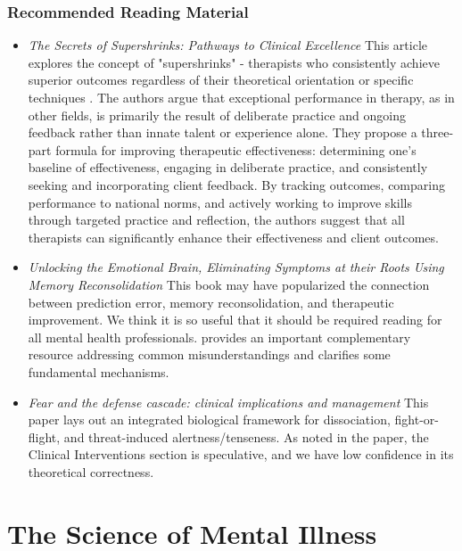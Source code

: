 \documentclass[12pt,letterpaper]{book}
\begin{document}
\subsection*{Recommended Reading Material}
\begin{itemize}
	\item \textit{The Secrets of Supershrinks: Pathways to Clinical Excellence} This article explores the concept of "supershrinks" - therapists who consistently achieve superior outcomes regardless of their theoretical orientation or specific techniques \cite{miller2014secrets}. The authors argue that exceptional performance in therapy, as in other fields, is primarily the result of deliberate practice and ongoing feedback rather than innate talent or experience alone. They propose a three-part formula for improving therapeutic effectiveness: determining one's baseline of effectiveness, engaging in deliberate practice, and consistently seeking and incorporating client feedback. By tracking outcomes, comparing performance to national norms, and actively working to improve skills through targeted practice and reflection, the authors suggest that all therapists can significantly enhance their effectiveness and client outcomes.
	\item \textit{Unlocking the Emotional Brain, Eliminating Symptoms at their Roots Using Memory Reconsolidation} This book may have popularized the connection between prediction error, memory reconsolidation, and therapeutic improvement. We think it is so useful that it should be required reading for all mental health professionals. \textcite{ecker2015misunderstood} provides an important complementary resource addressing common misunderstandings and clarifies some fundamental mechanisms.
	\item \textit{Fear and the defense cascade: clinical implications and management} This paper lays out an integrated biological framework for dissociation, fight-or-flight, and threat-induced alertness/tenseness. As noted in the paper, the Clinical Interventions section is speculative, and we have low confidence in its theoretical correctness.
\end{itemize}
\chapter{The Science of Mental Illness}
\end{document}
